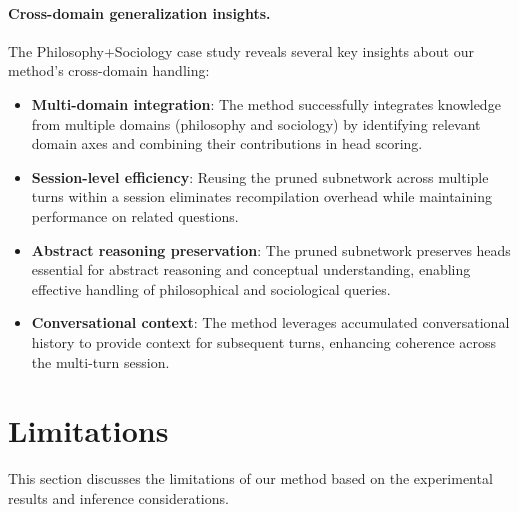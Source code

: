 \paragraph{Cross-domain generalization insights.}
The Philosophy+Sociology case study reveals several key insights about our method's cross-domain handling:
\begin{itemize}
    \item \textbf{Multi-domain integration}: The method successfully integrates knowledge from multiple domains (philosophy and sociology) by identifying relevant domain axes and combining their contributions in head scoring.
    \item \textbf{Session-level efficiency}: Reusing the pruned subnetwork across multiple turns within a session eliminates recompilation overhead while maintaining performance on related questions.
    \item \textbf{Abstract reasoning preservation}: The pruned subnetwork preserves heads essential for abstract reasoning and conceptual understanding, enabling effective handling of philosophical and sociological queries.
    \item \textbf{Conversational context}: The method leverages accumulated conversational history to provide context for subsequent turns, enhancing coherence across the multi-turn session.
\end{itemize}


\clearpage
{}

\section{Limitations}
\label{app:limitations}

This section discusses the limitations of our method based on the experimental results and inference considerations.

